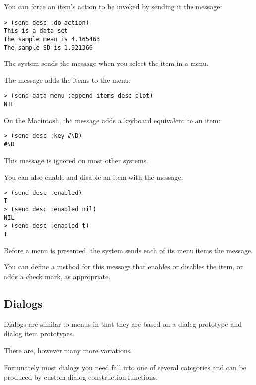 \begin{slide}{}
You can force an item's action to be invoked by sending it the
 message:
{\Large
\begin{verbatim}
> (send desc :do-action)
This is a data set
The sample mean is 4.165463
The sample SD is 1.921366
\end{verbatim}}

The system sends the  message when you select the item
in a menu.

The  message adds the items to the menu:
{\Large
\begin{verbatim}
> (send data-menu :append-items desc plot)
NIL
\end{verbatim}}
\end{slide}

\begin{slide}{}
On the Macintosh, the  message adds a keyboard equivalent
to an item:
{\Large
\begin{verbatim}
> (send desc :key #\D)
#\D
\end{verbatim}}
This message is ignored on most other systems.

You can also enable and disable an item with the 
message:
{\Large
\begin{verbatim}
> (send desc :enabled)
T
> (send desc :enabled nil)
NIL
> (send desc :enabled t)
T
\end{verbatim}}
Before a menu is presented, the system sends each of its menu items
the  message.

You can define a method for this message that enables or disables the
item, or adds a check mark, as appropriate.
\end{slide}

\begin{slide}{}
\section{Dialogs}
Dialogs are similar to menus in that they are based on a dialog
prototype and dialog item prototypes.

There are, however many more variations.

Fortunately most dialogs you need fall into one of several categories
and can be produced by custom dialog construction functions.
\end{slide}

